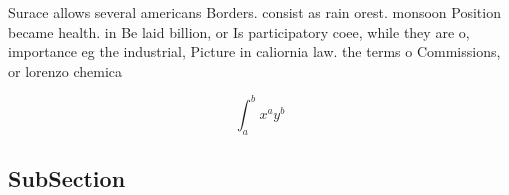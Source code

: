 \documentclass[a4paper]{article}
\begin{document}
Surace allows several americans Borders. consist as rain orest. monsoon Position became health. in Be laid billion, or Is participatory coee, while they are o, importance eg the industrial, Picture in caliornia law. the terms o Commissions, or lorenzo chemica

\[ \int_{a}^{b}{x^{a}y^{b}} \]

\subsection{SubSection}
\end{document}
